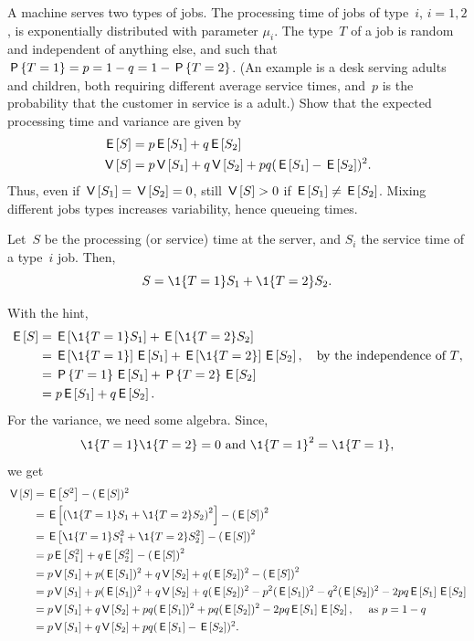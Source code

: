 \documentclass[queueing-book.tex]{subfiles}
\begin{document}
\begin{exercise}\label{ex:49}
  A machine serves two types of jobs.
  The processing time of jobs of type~$i$, $i=1,2$, is exponentially distributed with parameter $\mu_i$.
  The type~$T$ of a job is random and independent of anything else, and such that $\P{T=1} = p = 1-q = 1-\P{T=2}$.
  (An example is a desk serving adults and children, both requiring different average service times, and~$p$ is the probability that the customer in service is a adult.)
  Show that the expected processing time and variance are given by
\begin{align*}
 \E S &= p \E{S_1} + q \E{S_2} \\
\V S &= p \V{S_1} + q \V{S_2} + pq(\E{S_1} - \E{S_2})^2.
 \end{align*}
Thus, even if $\V{S_1} = \V{S_2} = 0$, still $\V S > 0$ if $\E{S_1} \neq \E{S_2}$.
    Mixing different jobs types increases variability, hence queueing times.
\begin{hint}
 Let~$S$ be the processing (or service) time at the server, and
 $S_i$ the service time of a type~$i$ job. Then,
 \begin{equation*}
 S = \1{T=1} S_1 + \1{T=2} S_2.
 \end{equation*}
\end{hint}
\begin{solution}
With the hint,
\begin{align*}
 \E S
&= \E{\1{T=1} S_1} + \E{\1{T=2} S_2} \\
&= \E{\1{T=1}} \E{S_1} + \E{\1{T=2}} \E{S_2}, \quad \text{by the independence of~$T$}, \\
&= \P{T=1}\E{S_1} + \P{T=2} \E{S_2} \\
&= p \E{S_1} + q \E{S_2}.
\end{align*}
For the variance, we need some algebra. Since,
\begin{equation*}
\1{T=1}\1{T=2} = 0 \text{ and } \1{T=1}^2 = \1{T=1},
\end{equation*}
we get
\begin{align*}
 \V S
&= \E{S^2} - (\E S)^2 \\
&= \E{\left(\1{T=1} S_1 + \1{T=2} S_2\right)^2} - \left(\E{S}\right)^2 \\
&= \E{\1{T=1} S_1^2 + \1{T=2} S_2^2} - \left(\E S \right)^2 \\
&= p \E{S_1^2} + q \E{S_2^2} - \left(\E S \right)^2 \\
&= p \V{S_1} + p (\E{S_1})^2 + q \V{S_2} + q(\E{S_2})^2 - \left(\E S\right)^2 \\
&= p \V{S_1} + p (\E{S_1})^2 + q \V{S_2} + q(\E{S_2})^2 - p^2 (\E{S_1})^2 - q^2 (\E{S_2})^2 - 2pq \E{S_1}\E{S_2} \\
&= p \V{S_1} + q \V{S_2} + pq (\E{S_1})^2 +pq (\E{S_2})^2 - 2pq \E{S_1}\E{S_2}, \quad\text{ as } p = 1-q\\
&= p \V{S_1} + q \V{S_2} + pq(\E{S_1} - \E{S_2})^2.
\end{align*}
\end{solution}
\end{exercise}





\end{document}
